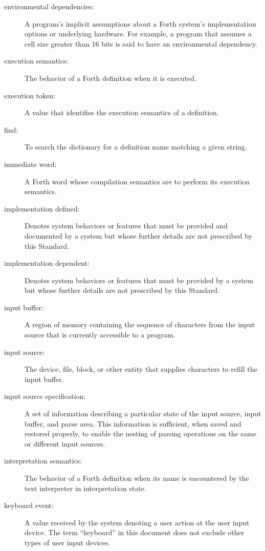 \begin{description}
\item[environmental dependencies:]
A program's implicit assumptions about a Forth system's
implementation options or underlying hardware. For example,
a program that assumes a cell size greater than 16 bits is
said to have an environmental dependency.

\item[execution semantics:]
The behavior of a Forth definition when it is executed.

\item[execution token:]
A value that identifies the execution semantics of a definition.

\item[find:]
To search the dictionary for a definition name matching a given string.

\item[immediate word:]
A Forth word whose compilation semantics are to perform its execution
semantics.

\item[implementation defined:]
Denotes system behaviors or features that must be provided and
documented by a system but whose further details are not prescribed
by this Standard.

\item[implementation dependent:]
Denotes system behaviors or features that must be provided by a
system but whose further details are not prescribed by this Standard.

\item[input buffer:]
A region of memory containing the sequence of characters from the
input source that is currently accessible to a program.

\item[input source:]
The device, file, block, or other entity that supplies characters
to refill the input buffer.

\item[input source specification:]
A set of information describing a particular state of the input
source, input buffer, and parse area. This information is sufficient,
when saved and restored properly, to enable the nesting of parsing
operations on the same or different input sources.

\item[interpretation semantics:]
The behavior of a Forth definition when its name is encountered
by the text interpreter in interpretation state.

\item[keyboard event:]
A value received by the system denoting a user action at the user
input device. The term ``keyboard'' in this document does not exclude
other types of user input devices.


\end{description}
